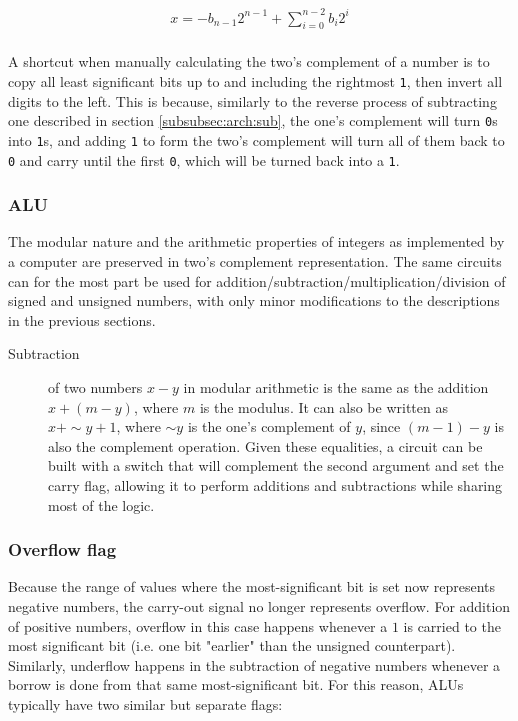 \begin{align*}
    x = -b_{n-1}2^{n-1} + \sum_{i=0}^{n-2}b_i2^i \\
\end{align*}

A shortcut when manually calculating the two's complement of a number is to copy
all least significant bits up to and including the rightmost \texttt{1}, then
invert all digits to the left.  This is because, similarly to the reverse
process of subtracting one described in section \ref{subsubsec:arch:sub}, the
one's complement will turn \texttt{0}s into \texttt{1}s, and adding \texttt{1}
to form the two's complement will turn all of them back to \texttt{0} and carry
until the first \texttt{0}, which will be turned back into a \texttt{1}.

\subsubsection{ALU}

The modular nature and the arithmetic properties of integers as implemented by a
computer are preserved in two's complement representation.  The same circuits
can for the most part be used for addition/subtraction/multiplication/division
of signed and unsigned numbers, with only minor modifications to the
descriptions in the previous sections.

\begin{description}
    \item[Subtraction]
        of two numbers $x - y$ in modular arithmetic is the same as the addition
        $x + (m - y)$, where $m$ is the modulus.  It can also be written as $x +
        \sim{}y + 1$, where $\sim{}y$ is the one's complement of $y$, since $(m
        - 1) - y$ is also the complement operation.  Given these equalities, a
        circuit can be built with a switch that will complement the second
        argument and set the carry flag, allowing it to perform additions and
        subtractions while sharing most of the logic.
\end{description}

\subsubsection{Overflow flag}

Because the range of values where the most-significant bit is set now represents
negative numbers, the carry-out signal no longer represents overflow.  For
addition of positive numbers, overflow in this case happens whenever a $1$ is
carried to the most significant bit (i.e. one bit "earlier" than the unsigned
counterpart).  Similarly, underflow happens in the subtraction of negative
numbers whenever a borrow is done from that same most-significant bit.  For this
reason, ALUs typically have two similar but separate flags:

